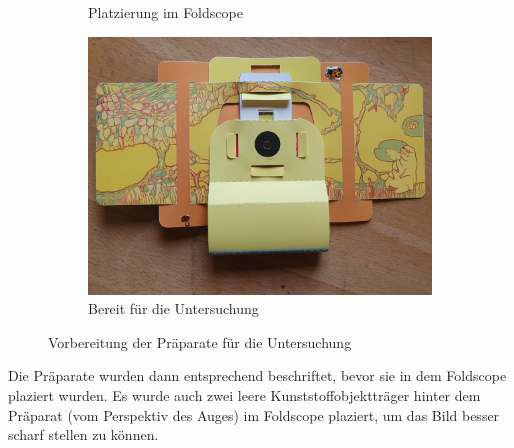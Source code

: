 \begin{figure}[H]
\begin{subfigure}[b]{0.3\textwidth}
				\caption{Platzierung im Foldscope}
			\end{subfigure}
			\hspace{5pt}
			\begin{subfigure}[b]{0.3\textwidth}
				\includegraphics[width=\textwidth]{images/tv2/build-03.jpg}
				\caption{Bereit für die Untersuchung}
			\end{subfigure}
			\caption{Vorbereitung der Präparate für die Untersuchung}
			\vspace{-1em}
		\end{figure}
		Die Präparate wurden dann entsprechend beschriftet, bevor sie in dem Foldscope plaziert wurden. Es wurde auch zwei leere Kunststoffobjektträger hinter dem Präparat (vom Perspektiv des Auges) im Foldscope plaziert, um das Bild besser scharf stellen zu können.

